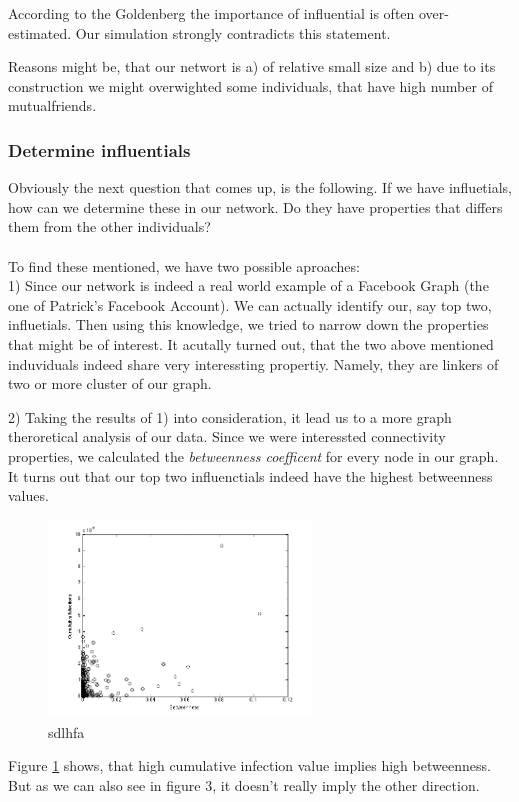 According to the Goldenberg \cite{word2mouth} the importance of influential is often over-estimated. Our simulation strongly contradicts this statement. 

Reasons might be, that our networt is a) of relative small size and b) due to its construction we might overwighted some individuals, that have high number of mutualfriends.


\subsubsection{Determine influentials}

Obviously the next question that comes up, is the following. If we have influetials, how can we determine these in our network. Do they have properties that differs them from the other individuals? \\ 
\\
To find these mentioned, we have two possible aproaches: 
\\

1) Since our network is indeed a real world example of a Facebook Graph (the one of Patrick's Facebook Account). We can actually identify our, say top two, influetials. Then using this knowledge, we tried to narrow down the properties that might be of interest. 
It acutally turned out, that the two above mentioned induviduals indeed share very interessting propertiy. Namely, they are linkers of two or more cluster of our graph. 

2) Taking the results of 1) into consideration, it lead us to a more graph theroretical analysis of our data. Since we were interessted connectivity properties, we calculated the \textit{betweenness coefficent} for every node in our graph. 
It turns out that our top two influenctials indeed have the highest betweenness values. 

\begin{figure}
\includegraphics[width=7cm]{influ4}
\caption{sdlhfa}
\label{Betweenness}
\end{figure}

Figure \ref{Betweenness} shows, that high cumulative infection value implies high betweenness. But as we can also see in figure 3, it doesn't really imply the other direction.



